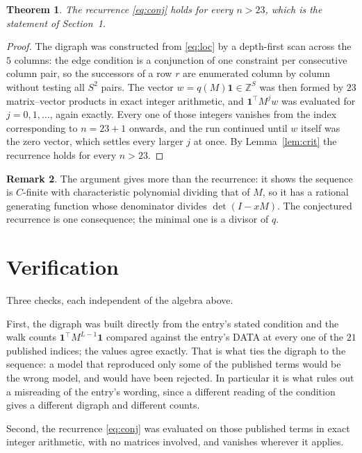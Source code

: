 \documentclass[11pt,a4paper]{article}
\theoremstyle{plain}
\newtheorem{theorem}{Theorem}
\theoremstyle{definition}
\newtheorem{remark}[theorem]{Remark}
\begin{document}
\begin{theorem}
The recurrence \eqref{eq:conj} holds for every $n>23$, which is the statement of
Section~1.
\end{theorem}

\begin{proof}
The digraph was constructed from \eqref{eq:loc} by a depth-first scan across the $5$
columns: the edge condition is a conjunction of one constraint per consecutive column
pair, so the successors of a row $r$ are enumerated column by column without testing all
$S^2$ pairs. The vector $w=q(M)\mathbf{1}\in\mathbb{Z}^{S}$ was then formed by $23$
matrix--vector products in exact integer arithmetic, and $\mathbf{1}^{\!\top}M^{j}w$ was
evaluated for $j=0,1,\dots$, again exactly. Every one of those integers vanishes from the
index corresponding to $n=23+1$ onwards, and the run continued until $w$ itself was the
zero vector, which settles every larger $j$ at once. By Lemma~\ref{lem:crit} the recurrence
holds for every $n>23$.
\end{proof}

\begin{remark}
The argument gives more than the recurrence: it shows the sequence is $C$-finite with
characteristic polynomial dividing that of $M$, so it has a rational generating function
whose denominator divides $\det(I-xM)$. The conjectured recurrence is one consequence; the
minimal one is a divisor of $q$.
\end{remark}

\section{Verification}

Three checks, each independent of the algebra above.

First, the digraph was built directly from the entry's stated condition and the walk counts
$\mathbf{1}^{\!\top}M^{L-1}\mathbf{1}$ compared against the entry's DATA at
every one of the $21$ published indices; the values agree exactly. That is what ties
the digraph to the sequence: a model that reproduced only some of the published terms would
be the wrong model, and would have been rejected. In particular it is what rules out a
misreading of the entry's wording, since a different reading of the condition gives a
different digraph and different counts.

Second, the recurrence \eqref{eq:conj} was evaluated on those published terms in exact
integer arithmetic, with no matrices involved, and vanishes wherever it applies.
\end{document}
